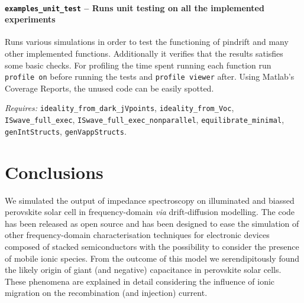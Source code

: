 		\paragraph{\texttt{examples\_unit\_test} -- Runs unit testing on all the implemented experiments}
Runs various simulations in order to test the functioning of pindrift and many other implemented functions.
Additionally it verifies that the results satisfies some basic checks.
For profiling the time spent running each function run \texttt{profile on} before running the tests and \texttt{profile viewer} after.
Using Matlab's Coverage Reports, the unused code can be easily spotted.

\textit{Requires:} \texttt{ideality\_from\_dark\_jVpoints}, \texttt{ideality\_from\_Voc}, \texttt{ISwave\_full\_exec}, \texttt{ISwave\_full\_exec\_nonparallel}, \texttt{equilibrate\_minimal}, \texttt{gen\-Int\-Structs}, \texttt{gen\-Vapp\-Structs}.


\section{Conclusions}
We simulated the output of impedance spectroscopy on illuminated and biassed perovskite solar cell in frequency\hyp{}domain \textsl{via} drift\hyp{}diffusion modelling.
The code has been released as open source and has been designed to ease the simulation of other frequency\hyp{}domain characterisation techniques for electronic devices composed of stacked semiconductors with the possibility to consider the presence of mobile ionic species.
From the outcome of this model we serendipitously found the likely origin of giant (and negative) capacitance in perovskite solar cells.
These phenomena are explained in detail considering the influence of ionic migration on the recombination (and injection) current.

